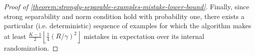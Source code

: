 \begin{proof}[Proof of \autoref{theorem:strongly-separable-examples-mistake-lower-bound}]
Finally, since strong separability and norm condition hold with probability one,
there exists a particular (i.e. deterministic) sequence of examples for which
the algorithm makes at least $\frac{K-1}2 \left\lfloor \frac 1 4 (R/\gamma)^2
\right\rfloor$ mistakes in expectation over its internal randomization.
\end{proof}
